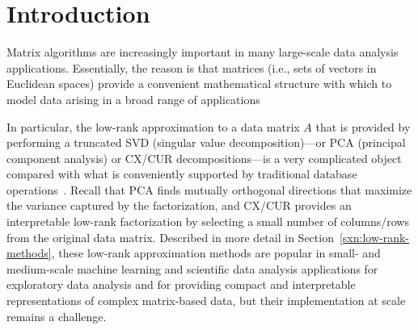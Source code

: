 \section{Introduction}
\label{sec:intro}

Matrix algorithms are increasingly important in many large-scale data analysis applications.
Essentially, the reason is that matrices (i.e., sets of vectors in Euclidean
spaces) provide a convenient mathematical structure with which to model data
arising in a broad range of applications

In particular, the low-rank approximation to a data matrix $A$ that is provided
by performing a truncated SVD (singular value decomposition)---or PCA
(principal component analysis) or CX/CUR decompositions---is a very complicated
object compared with what is conveniently supported by traditional database
operations~\cite{Skillicorn07}. Recall that PCA finds mutually orthogonal
directions that maximize the variance captured by the factorization, and CX/CUR
provides an interpretable low-rank factorization by selecting a small number of
columns/rows from the original data matrix.  Described in more detail in
Section~\ref{sxn:low-rank-methods}, these low-rank approximation methods are
popular in small- and medium-scale machine learning and scientific data
analysis applications for exploratory data analysis and for
providing compact and interpretable representations of complex matrix-based
data, but their implementation at scale remains a challenge.



